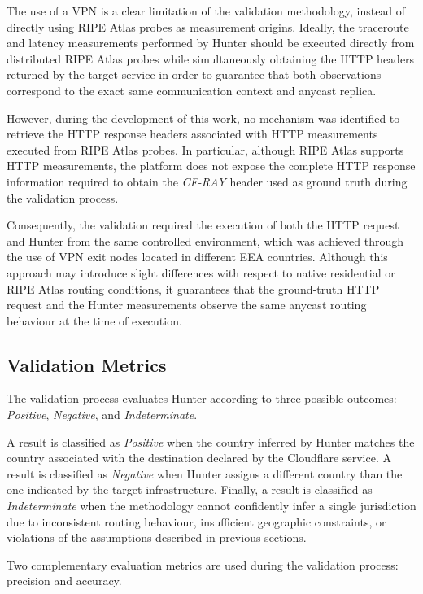 \documentclass[
A4paper,                %
twoside,                %
openright,              %
chapterprefix=true,     %
12pt,                   %
headings=normal,        %
titlepage=on            %
]{book}
\begin{document}
The use of a VPN is a clear limitation of the validation methodology, instead of directly using RIPE Atlas probes as measurement origins. Ideally, the traceroute and latency measurements performed by Hunter should be executed directly from distributed RIPE Atlas probes while simultaneously obtaining the HTTP headers returned by the target service in order to guarantee that both observations correspond to the exact same communication context and anycast replica.

However, during the development of this work, no mechanism was identified to retrieve the HTTP response headers associated with HTTP measurements executed from RIPE Atlas probes. In particular, although RIPE Atlas supports HTTP measurements, the platform does not expose the complete HTTP response information required to obtain the \textit{CF-RAY} header used as ground truth during the validation process.

Consequently, the validation required the execution of both the HTTP request and Hunter from the same controlled environment, which was achieved through the use of VPN exit nodes located in different EEA countries. Although this approach may introduce slight differences with respect to native residential or RIPE Atlas routing conditions, it guarantees that the ground-truth HTTP request and the Hunter measurements observe the same anycast routing behaviour at the time of execution.

\subsection{Validation Metrics}

The validation process evaluates Hunter according to three possible outcomes: \textit{Positive}, \textit{Negative}, and \textit{Indeterminate}.

A result is classified as \textit{Positive} when the country inferred by Hunter matches the country associated with the destination declared by the Cloudflare service. A result is classified as \textit{Negative} when Hunter assigns a different country than the one indicated by the target infrastructure. Finally, a result is classified as \textit{Indeterminate} when the methodology cannot confidently infer a single jurisdiction due to inconsistent routing behaviour, insufficient geographic constraints, or violations of the assumptions described in previous sections.

Two complementary evaluation metrics are used during the validation process: precision and accuracy.
\end{document}
